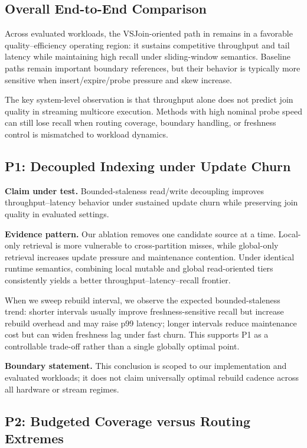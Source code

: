 \subsection{Overall End-to-End Comparison}

Across evaluated workloads, the VSJoin-oriented path in \system remains in a favorable quality--efficiency operating region: it sustains competitive throughput and tail latency while maintaining high recall under sliding-window semantics. Baseline paths remain important boundary references, but their behavior is typically more sensitive when insert/expire/probe pressure and skew increase.

The key system-level observation is that throughput alone does not predict join quality in streaming multicore execution. Methods with high nominal probe speed can still lose recall when routing coverage, boundary handling, or freshness control is mismatched to workload dynamics.

\subsection{P1: Decoupled Indexing under Update Churn}

\textbf{Claim under test.}
Bounded-staleness read/write decoupling improves throughput--latency behavior under sustained update churn while preserving join quality in evaluated settings.

\textbf{Evidence pattern.}
Our ablation removes one candidate source at a time. Local-only retrieval is more vulnerable to cross-partition misses, while global-only retrieval increases update pressure and maintenance contention. Under identical runtime semantics, combining local mutable and global read-oriented tiers consistently yields a better throughput--latency--recall frontier.

When we sweep rebuild interval, we observe the expected bounded-staleness trend: shorter intervals usually improve freshness-sensitive recall but increase rebuild overhead and may raise p99 latency; longer intervals reduce maintenance cost but can widen freshness lag under fast churn. This supports P1 as a controllable trade-off rather than a single globally optimal point.

\textbf{Boundary statement.}
This conclusion is scoped to our implementation and evaluated workloads; it does not claim universally optimal rebuild cadence across all hardware or stream regimes.

\subsection{P2: Budgeted Coverage versus Routing Extremes}

